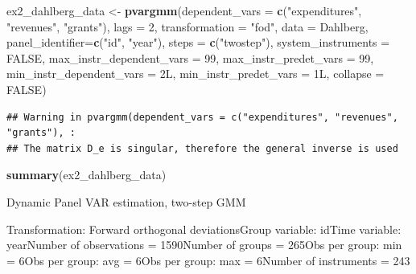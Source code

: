 \documentclass[
]{book}
\newenvironment{Shaded}{\begin{snugshade}}{\end{snugshade}}
\newcommand{\AttributeTok}[1]{\textcolor[rgb]{0.13,0.29,0.53}{#1}}
\newcommand{\ConstantTok}[1]{\textcolor[rgb]{0.56,0.35,0.01}{#1}}
\newcommand{\DecValTok}[1]{\textcolor[rgb]{0.00,0.00,0.81}{#1}}
\newcommand{\FunctionTok}[1]{\textcolor[rgb]{0.13,0.29,0.53}{\textbf{#1}}}
\newcommand{\NormalTok}[1]{#1}
\newcommand{\OtherTok}[1]{\textcolor[rgb]{0.56,0.35,0.01}{#1}}
\newcommand{\StringTok}[1]{\textcolor[rgb]{0.31,0.60,0.02}{#1}}
\begin{document}
\begin{Shaded}
\begin{Highlighting}[]
\NormalTok{ex2\_dahlberg\_data }\OtherTok{\textless{}{-}} \FunctionTok{pvargmm}\NormalTok{(}\AttributeTok{dependent\_vars =} \FunctionTok{c}\NormalTok{(}\StringTok{"expenditures"}\NormalTok{, }\StringTok{"revenues"}\NormalTok{, }\StringTok{"grants"}\NormalTok{),}
                             \AttributeTok{lags =} \DecValTok{2}\NormalTok{,}
                             \AttributeTok{transformation =} \StringTok{"fod"}\NormalTok{,}
                             \AttributeTok{data =}\NormalTok{ Dahlberg,}
                             \AttributeTok{panel\_identifier=}\FunctionTok{c}\NormalTok{(}\StringTok{"id"}\NormalTok{, }\StringTok{"year"}\NormalTok{),}
                             \AttributeTok{steps =} \FunctionTok{c}\NormalTok{(}\StringTok{"twostep"}\NormalTok{),}
                             \AttributeTok{system\_instruments =} \ConstantTok{FALSE}\NormalTok{,}
                             \AttributeTok{max\_instr\_dependent\_vars =} \DecValTok{99}\NormalTok{,}
                             \AttributeTok{max\_instr\_predet\_vars =} \DecValTok{99}\NormalTok{,}
                             \AttributeTok{min\_instr\_dependent\_vars =}\NormalTok{ 2L,}
                             \AttributeTok{min\_instr\_predet\_vars =}\NormalTok{ 1L,}
                             \AttributeTok{collapse =} \ConstantTok{FALSE}\NormalTok{)}
\end{Highlighting}
\end{Shaded}

\begin{verbatim}
## Warning in pvargmm(dependent_vars = c("expenditures", "revenues", "grants"), :
## The matrix D_e is singular, therefore the general inverse is used
\end{verbatim}

\begin{Shaded}
\begin{Highlighting}[]
\FunctionTok{summary}\NormalTok{(ex2\_dahlberg\_data)}
\end{Highlighting}
\end{Shaded}

Dynamic Panel VAR estimation, two-step GMM

Transformation: Forward orthogonal deviationsGroup variable: idTime variable: yearNumber of observations = 1590Number of groups = 265Obs per group: min = 6Obs per group: avg = 6Obs per group: max = 6Number of instruments = 243

~
\end{document}
